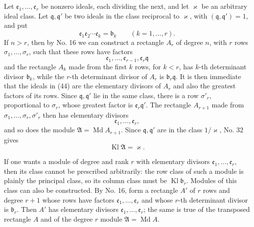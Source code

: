 \documentclass[11pt,a4paper]{article}
\newcommand{\Kl}{\operatorname{Kl}}
\begin{document}
Let \(\mathfrak e_1,\ldots,\mathfrak e_r\) be nonzero ideals, each dividing the next, and let \(\varkappa\) be an arbitrary ideal class. Let \(\mathfrak q,\mathfrak q'\) be two ideals in the class reciprocal to \(\varkappa\), with \((\mathfrak q,\mathfrak q')=1\), and put
\[
 \mathfrak e_1\mathfrak e_2\cdots\mathfrak e_k=\mathfrak b_k\qquad(k=1,\ldots,r).
\]
If \(n>r\), then by No. 16 we can construct a rectangle \(A_r\) of degree \(n\), with \(r\) rows \(\sigma_1,\ldots,\sigma_r\), such that these rows have factors
\[
 \mathfrak e_1,\ldots,\mathfrak e_{r-1},\mathfrak e_r\mathfrak q \tag{44}
\]
and the rectangle \(A_k\) made from the first \(k\) rows, for \(k<r\), has \(k\)-th determinant divisor \(\mathfrak b_k\), while the \(r\)-th determinant divisor of \(A_r\) is \(\mathfrak b_r\mathfrak q\). It is then immediate that the ideals in (44) are the elementary divisors of \(A_r\) and also the greatest factors of its rows. Since \(\mathfrak q,\mathfrak q'\) lie in the same class, there is a row \(\sigma'_r\), proportional to \(\sigma_r\), whose greatest factor is \(\mathfrak e_r\mathfrak q'\). The rectangle \(A_{r+1}\) made from \(\sigma_1,\ldots,\sigma_r,\sigma'_r\) then has elementary divisors
\[
 \mathfrak e_1,\ldots,\mathfrak e_r,
\]
and so does the module \(\mathfrak A=\operatorname{Md}A_{r+1}\). Since \(\mathfrak q,\mathfrak q'\) are in the class \(1/\varkappa\), No. 32 gives
\[
 \Kl\mathfrak A=\varkappa.
\]

If one wants a module of degree and rank \(r\) with elementary divisors \(\mathfrak e_1,\ldots,\mathfrak e_r\), then its class cannot be prescribed arbitrarily: the row class of such a module is plainly the principal class, so its column class must be \(\Kl\mathfrak b_r\). Modules of this class can also be constructed. By No. 16, form a rectangle \(A'\) of \(r\) rows and degree \(r+1\) whose rows have factors \(\mathfrak e_1,\ldots,\mathfrak e_r\) and whose \(r\)-th determinant divisor is \(\mathfrak b_r\). Then \(A'\) has elementary divisors \(\mathfrak e_1,\ldots,\mathfrak e_r\); the same is true of the transposed rectangle \(A\) and of the degree \(r\) module \(\mathfrak A=\operatorname{Md}A\).
\end{document}
